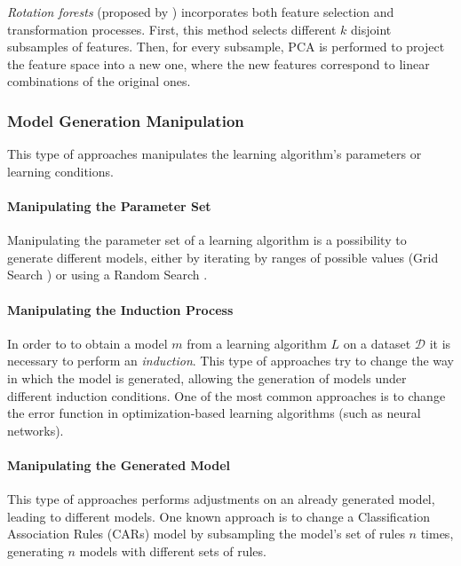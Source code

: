 \textit{Rotation forests} (proposed by \textcite{1677518}) incorporates both feature selection and transformation processes. First, this method selects different $k$ disjoint subsamples of features. Then, for every subsample, PCA is performed to project the feature space into a new one, where the new features correspond to linear combinations of the original ones.

\subsubsection{Model Generation Manipulation}

This type of approaches manipulates the learning algorithm's parameters or learning conditions.

\paragraph{Manipulating the Parameter Set}\mbox{}

Manipulating the parameter set of a learning algorithm is a possibility to generate different models, either by iterating by ranges of possible values (Grid Search \cite{hsu2003practical}) or using a Random Search \cite{bergstra2012random}.

\paragraph{Manipulating the Induction Process}\mbox{}

In order to to obtain a model $m$ from a learning algorithm $L$ on a dataset $\mathcal{D}$ it is necessary to perform an \textit{induction}. This type of approaches try to change the way in which the model is generated, allowing the generation of models under different induction conditions.
One of the most common approaches is to change the error function in optimization-based learning algorithms (such as neural networks).

\paragraph{Manipulating the Generated Model}\mbox{}

This type of approaches performs adjustments on an already generated model, leading to different models.
One known approach is to change a Classification Association Rules (CARs) model by subsampling the model's set of rules $n$ times, generating $n$ models with different sets of rules. 
	
